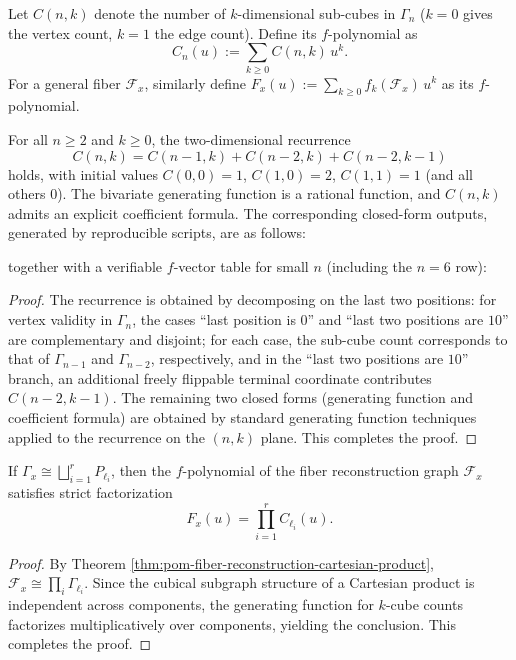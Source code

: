 \begin{definition}\label{def:pom-fibcube-fvector}
Let \(C(n,k)\) denote the number of \(k\)-dimensional sub-cubes in \(\Gamma_n\) (\(k=0\) gives the vertex count, \(k=1\) the edge count).
Define its \(f\)-polynomial as
\[
C_n(u):=\sum_{k\ge 0} C(n,k)\,u^k.
\]
For a general fiber \(\mathcal F_x\), similarly define
\(
F_x(u):=\sum_{k\ge 0} f_k(\mathcal F_x)\,u^k
\)
as its \(f\)-polynomial.
\end{definition}

\begin{theorem}\label{thm:pom-fibcube-fvector-closed}
For all \(n\ge 2\) and \(k\ge 0\), the two-dimensional recurrence
\[
C(n,k)=C(n-1,k)+C(n-2,k)+C(n-2,k-1)
\]
holds, with initial values \(C(0,0)=1\), \(C(1,0)=2\), \(C(1,1)=1\) (and all others \(0\)).
The bivariate generating function is a rational function, and \(C(n,k)\) admits an explicit coefficient formula.
The corresponding closed-form outputs, generated by reproducible scripts, are as follows:


together with a verifiable \(f\)-vector table for small \(n\) (including the \(n=6\) row):

\end{theorem}

\begin{proof}
The recurrence is obtained by decomposing on the last two positions: for vertex validity in \(\Gamma_n\), the cases ``last position is \(0\)'' and ``last two positions are \(10\)'' are complementary and disjoint;
for each case, the sub-cube count corresponds to that of \(\Gamma_{n-1}\) and \(\Gamma_{n-2}\), respectively,
and in the ``last two positions are \(10\)'' branch, an additional freely flippable terminal coordinate contributes \(C(n-2,k-1)\).
The remaining two closed forms (generating function and coefficient formula) are obtained by standard generating function techniques applied to the recurrence on the \((n,k)\) plane.
This completes the proof.
\end{proof}

\begin{corollary}\label{cor:pom-fiber-fpoly-factorization}
If \(\Gamma_x\cong\bigsqcup_{i=1}^r P_{\ell_i}\), then the \(f\)-polynomial of the fiber reconstruction graph \(\mathcal F_x\) satisfies strict factorization
\[
F_x(u)=\prod_{i=1}^r C_{\ell_i}(u).
\]
\end{corollary}
\begin{proof}
By Theorem \ref{thm:pom-fiber-reconstruction-cartesian-product},
\(
\mathcal F_x\cong \prod_i \Gamma_{\ell_i}
\).
Since the cubical subgraph structure of a Cartesian product is independent across components, the generating function for \(k\)-cube counts factorizes multiplicatively over components, yielding the conclusion. This completes the proof.
\end{proof}

